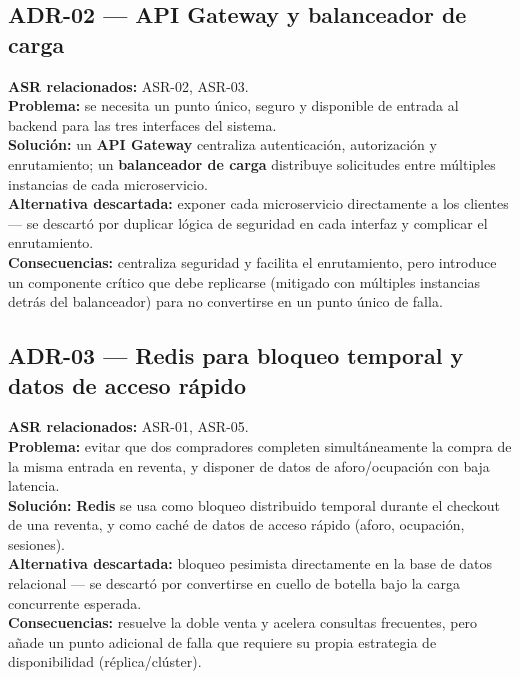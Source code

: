 \documentclass[11pt,a4paper]{article}
\begin{document}
\subsection*{ADR-02 --- API Gateway y balanceador de carga}
\textbf{ASR relacionados:} ASR-02, ASR-03.\\
\textbf{Problema:} se necesita un punto único, seguro y disponible de entrada al backend para las
tres interfaces del sistema.\\
\textbf{Solución:} un \textbf{API Gateway} centraliza autenticación, autorización y enrutamiento;
un \textbf{balanceador de carga} distribuye solicitudes entre múltiples instancias de cada
microservicio.\\
\textbf{Alternativa descartada:} exponer cada microservicio directamente a los clientes — se
descartó por duplicar lógica de seguridad en cada interfaz y complicar el enrutamiento.\\
\textbf{Consecuencias:} centraliza seguridad y facilita el enrutamiento, pero introduce un
componente crítico que debe replicarse (mitigado con múltiples instancias detrás del
balanceador) para no convertirse en un punto único de falla.

\subsection*{ADR-03 --- Redis para bloqueo temporal y datos de acceso rápido}
\textbf{ASR relacionados:} ASR-01, ASR-05.\\
\textbf{Problema:} evitar que dos compradores completen simultáneamente la compra de la misma
entrada en reventa, y disponer de datos de aforo/ocupación con baja latencia.\\
\textbf{Solución:} \textbf{Redis} se usa como bloqueo distribuido temporal durante el checkout de
una reventa, y como caché de datos de acceso rápido (aforo, ocupación, sesiones).\\
\textbf{Alternativa descartada:} bloqueo pesimista directamente en la base de datos relacional —
se descartó por convertirse en cuello de botella bajo la carga concurrente esperada.\\
\textbf{Consecuencias:} resuelve la doble venta y acelera consultas frecuentes, pero añade un
punto adicional de falla que requiere su propia estrategia de disponibilidad (réplica/clúster).
\end{document}
